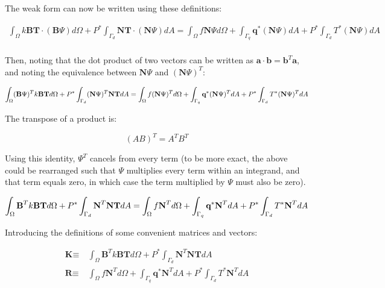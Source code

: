 \documentclass[10pt]{article}
\begin{document}
The weak form can now be written using these definitions:

\begin{equation}
\label{eq:WeakFormQ3}
\begin{aligned}
\int_{\Omega}k\textbf{B}\textbf{T}\cdot(\textbf{B}\Psi) d\Omega+P^{*}\int_{\Gamma_d}\textbf{N}\textbf{T}\cdot(\textbf{N}\Psi)dA=\int_{\Omega}f\textbf{N}\Psi d\Omega+\int_{\Gamma_q}\textbf{q}^{*}(\textbf{N}\Psi) dA+P^{*}\int_{\Gamma_d}T^{*}(\textbf{N}\Psi) dA\\
\end{aligned}
\end{equation}

Then, noting that the dot product of two vectors can be written as \(\textbf{a}\cdot\textbf{b}=\textbf{b}^T\textbf{a}\), and noting the equivalence between \(\textbf{N}\Psi\) and \((\textbf{N}\Psi)^T\):

\begin{equation}
\int_{\Omega}(\textbf{B}\Psi)^Tk\textbf{B}\textbf{T} d\Omega+P^{*}\int_{\Gamma_d}(\textbf{N}\Psi)^T\textbf{N}\textbf{T}dA=\int_{\Omega}f(\textbf{N}\Psi)^T d\Omega+\int_{\Gamma_q}\textbf{q}^{*}(\textbf{N}\Psi)^T dA+P^{*}\int_{\Gamma_d}T^{*}(\textbf{N}\Psi)^T dA\\
\end{equation}

The transpose of a product is:

\begin{equation}
(AB)^T=A^TB^T
\end{equation}

Using this identity, \(\Psi^T\) cancels from every term (to be more exact, the above could be rearranged such that \(\Psi\) multiplies every term within an integrand, and that term equals zero, in which case the term multiplied by \(\Psi\) must also be zero). 

\begin{equation}
\int_{\Omega}\textbf{B}^Tk\textbf{B}\textbf{T} d\Omega+P^{*}\int_{\Gamma_d}\textbf{N}^T\textbf{N}\textbf{T}dA=\int_{\Omega}f\textbf{N}^T d\Omega+\int_{\Gamma_q}\textbf{q}^{*}\textbf{N}^T dA+P^{*}\int_{\Gamma_d}T^{*}\textbf{N}^T dA\\
\end{equation}

Introducing the definitions of some convenient matrices and vectors:

\begin{equation}
\label{eq:TotalDomain}
\begin{aligned}
\textbf{K}\equiv&\ \int_{\Omega}\textbf{B}^Tk\textbf{B}\textbf{T} d\Omega+P^{*}\int_{\Gamma_d}\textbf{N}^T\textbf{N}\textbf{T}dA\\
\textbf{R}\equiv&\ \int_{\Omega}f\textbf{N}^T d\Omega+\int_{\Gamma_q}\textbf{q}^{*}\textbf{N}^T dA+P^{*}\int_{\Gamma_d}T^{*}\textbf{N}^T dA\\
\end{aligned}
\end{equation}
\end{document}
